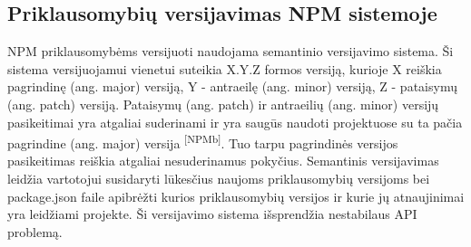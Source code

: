\subsection{Priklausomybių versijavimas NPM sistemoje}

NPM priklausomybėms versijuoti naudojama semantinio versijavimo sistema. Ši sistema versijuojamui vienetui
suteikia X.Y.Z formos versiją, kurioje X reiškia pagrindinę (ang. major) versiją, Y - antraeilę (ang. minor) versiją,
Z - pataisymų (ang. patch) versiją. Pataisymų (ang. patch) ir antraeilių (ang. minor) versijų pasikeitimai yra atgaliai suderinami
ir yra saugūs naudoti projektuose su ta pačia pagrindine (ang. major) versija \textsuperscript{[NPMb]}.
Tuo tarpu pagrindinės versijos pasikeitimas reiškia atgaliai nesuderinamus pokyčius.
Semantinis versijavimas leidžia vartotojui susidaryti lūkesčius naujoms priklausomybių versijoms bei
package.json faile apibrėžti kurios priklausomybių versijos ir kurie jų atnaujinimai yra leidžiami projekte.
Ši versijavimo sistema išsprendžia nestabilaus API problemą. %
